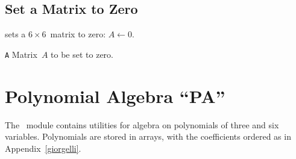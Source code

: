 \section{Set a Matrix to Zero}
\label{M66ZRO}
sets a $6 \times 6$~matrix to zero: $A \leftarrow 0$.
\begin{mylist}
\item[\tt A]
Matrix~$A$ to be set to zero.
\end{mylist}


\chapter{Polynomial Algebra ``PA''}
\label{PA}
The ~module contains utilities for algebra on polynomials of
three and six variables.
Polynomials are stored in arrays,
with the coefficients ordered as in Appendix~\ref{giorgelli}.

